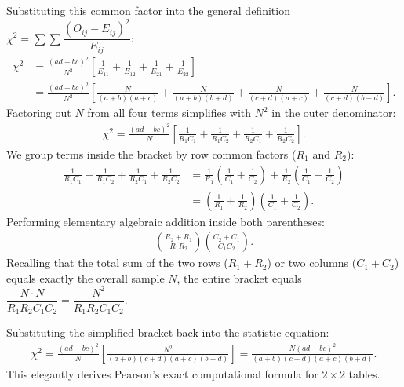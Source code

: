 \begin{solproblema}
\begin{enumerate}
		Substituting this common factor into the general definition $\chi^2 = \sum \sum \dfrac{(O_{ij} - E_{ij})^2}{E_{ij}}$:
		\begin{align}
			\chi^2 &= \frac{(ad - bc)^2}{N^2} \left[ \frac{1}{E_{11}} + \frac{1}{E_{12}} + \frac{1}{E_{21}} + \frac{1}{E_{22}} \right] \\
			&= \frac{(ad - bc)^2}{N^2} \left[ \frac{N}{(a+b)(a+c)} + \frac{N}{(a+b)(b+d)} + \frac{N}{(c+d)(a+c)} + \frac{N}{(c+d)(b+d)} \right].
		\end{align}
		Factoring out $N$ from all four terms simplifies with $N^2$ in the outer denominator:
		\begin{align}
			\chi^2 = \frac{(ad - bc)^2}{N} \left[ \frac{1}{R_1 C_1} + \frac{1}{R_1 C_2} + \frac{1}{R_2 C_1} + \frac{1}{R_2 C_2} \right].
		\end{align}
		We group terms inside the bracket by row common factors ($R_1$ and $R_2$):
		\begin{align}
			\frac{1}{R_1 C_1} + \frac{1}{R_1 C_2} + \frac{1}{R_2 C_1} + \frac{1}{R_2 C_2} &= \frac{1}{R_1}\left( \frac{1}{C_1} + \frac{1}{C_2} \right) + \frac{1}{R_2}\left( \frac{1}{C_1} + \frac{1}{C_2} \right) \\
			&= \left( \frac{1}{R_1} + \frac{1}{R_2} \right) \left( \frac{1}{C_1} + \frac{1}{C_2} \right).
		\end{align}
		Performing elementary algebraic addition inside both parentheses:
		\begin{align}
			\left( \frac{R_2 + R_1}{R_1 R_2} \right) \left( \frac{C_2 + C_1}{C_1 C_2} \right).
		\end{align}
		Recalling that the total sum of the two rows ($R_1 + R_2$) or two columns ($C_1 + C_2$) equals exactly the overall sample $N$, the entire bracket equals $\dfrac{N \cdot N}{R_1 R_2 C_1 C_2} = \dfrac{N^2}{R_1 R_2 C_1 C_2}$.
		
		Substituting the simplified bracket back into the statistic equation:
		\begin{align}
			\chi^2 = \frac{(ad - bc)^2}{N} \left[ \frac{N^2}{(a+b)(c+d)(a+c)(b+d)} \right] = \frac{N(ad - bc)^2}{(a+b)(c+d)(a+c)(b+d)}.
		\end{align}
		This elegantly derives Pearson's exact computational formula for $2 \times 2$ tables.
		

\end{enumerate}
\end{solproblema}
